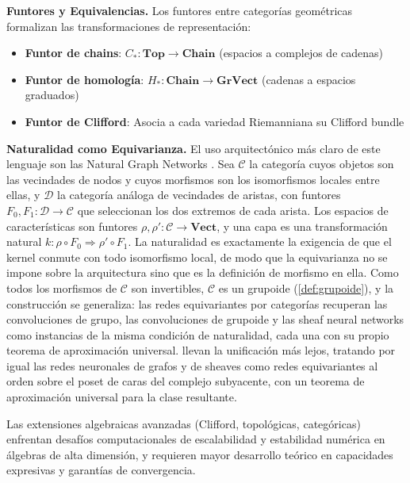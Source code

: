 \textbf{Funtores y Equivalencias.}\label{rem:funtores_equivalencias} Los funtores entre categorías geométricas formalizan las transformaciones de representación:
\begin{itemize}
    \item \textbf{Funtor de chains}: $C_*: \textbf{Top} \to \textbf{Chain}$ (espacios a complejos de cadenas)
    \item \textbf{Funtor de homología}: $H_*: \textbf{Chain} \to \textbf{GrVect}$ (cadenas a espacios graduados)
    \item \textbf{Funtor de Clifford}: Asocia a cada variedad Riemanniana su Clifford bundle
\end{itemize}
\textbf{Naturalidad como Equivarianza.} El uso arquitectónico más claro de este lenguaje son las Natural Graph Networks \citep{dehaan2020natural}. Sea $\mathcal{C}$ la categoría cuyos objetos son las vecindades de nodos y cuyos morfismos son los isomorfismos locales entre ellas, y $\mathcal{D}$ la categoría análoga de vecindades de aristas, con funtores $F_0, F_1: \mathcal{D} \to \mathcal{C}$ que seleccionan los dos extremos de cada arista. Los espacios de características son funtores $\rho, \rho': \mathcal{C} \to \mathbf{Vect}$, y una capa es una transformación natural $k: \rho \circ F_0 \Rightarrow \rho' \circ F_1$. La naturalidad es exactamente la exigencia de que el kernel conmute con todo isomorfismo local, de modo que la equivarianza no se impone sobre la arquitectura sino que es la definición de morfismo en ella. Como todos los morfismos de $\mathcal{C}$ son invertibles, $\mathcal{C}$ es un grupoide (\autoref{def:grupoide}), y la construcción se generaliza: las redes equivariantes por categorías \citep{maruyama2025categorical} recuperan las convoluciones de grupo, las convoluciones de grupoide y las sheaf neural networks como instancias de la misma condición de naturalidad, cada una con su propio teorema de aproximación universal. \citet{maruyama2026foundations} llevan la unificación más lejos, tratando por igual las redes neuronales de grafos y de sheaves como redes equivariantes al orden sobre el poset de caras del complejo subyacente, con un teorema de aproximación universal para la clase resultante.


Las extensiones algebraicas avanzadas (Clifford, topológicas, categóricas) enfrentan desafíos computacionales de escalabilidad y estabilidad numérica en álgebras de alta dimensión, y requieren mayor desarrollo teórico en capacidades expresivas y garantías de convergencia.

